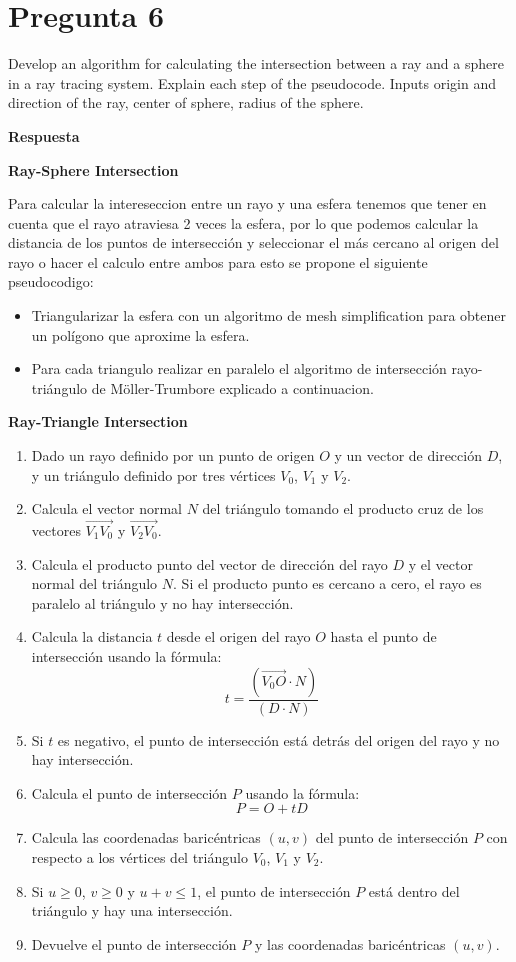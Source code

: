\documentclass{article}
\begin{document}
\section{Pregunta 6}
Develop an algorithm for calculating the intersection between a ray and a sphere in a ray tracing system. Explain each step of the pseudocode. Inputs origin and direction of the ray, center of sphere, radius of the sphere.

\textbf{Respuesta}

\textbf{Ray-Sphere Intersection}

Para calcular la intereseccion entre un rayo y una esfera tenemos que tener en cuenta que el rayo atraviesa 2 veces la esfera, por lo que podemos calcular la distancia de los puntos de intersección y seleccionar el más cercano al origen del rayo o hacer el calculo entre ambos para esto se propone el siguiente pseudocodigo:

\begin{itemize}
    \item Triangularizar la esfera con un algoritmo de mesh simplification para obtener un polígono que aproxime la esfera.
    \item Para cada triangulo realizar en paralelo el algoritmo de intersección rayo-triángulo de Möller-Trumbore explicado a continuacion.
\end{itemize}

\textbf{Ray-Triangle Intersection}

\begin{enumerate}
    \item Dado un rayo definido por un punto de origen $O$ y un vector de dirección $D$, y un triángulo definido por tres vértices $V_0$, $V_1$ y $V_2$.
    \item Calcula el vector normal $N$ del triángulo tomando el producto cruz de los vectores $\overrightarrow{V_1V_0}$ y $\overrightarrow{V_2V_0}$.
    \item Calcula el producto punto del vector de dirección del rayo $D$ y el vector normal del triángulo $N$. Si el producto punto es cercano a cero, el rayo es paralelo al triángulo y no hay intersección.
    \item Calcula la distancia $t$ desde el origen del rayo $O$ hasta el punto de intersección usando la fórmula:
    \[
    t = \frac{{(\overrightarrow{V_0O} \cdot N)}}{{(D \cdot N)}}
    \]
    \item Si $t$ es negativo, el punto de intersección está detrás del origen del rayo y no hay intersección.
    \item Calcula el punto de intersección $P$ usando la fórmula:
    \[
    P = O + tD
    \]
    \item Calcula las coordenadas baricéntricas $(u, v)$ del punto de intersección $P$ con respecto a los vértices del triángulo $V_0$, $V_1$ y $V_2$.
    \item Si $u \geq 0$, $v \geq 0$ y $u + v \leq 1$, el punto de intersección $P$ está dentro del triángulo y hay una intersección.
    \item Devuelve el punto de intersección $P$ y las coordenadas baricéntricas $(u, v)$.
\end{enumerate}
\end{document}
